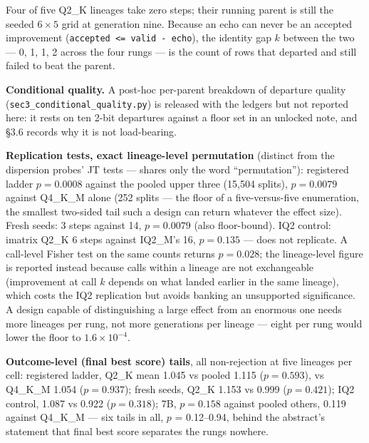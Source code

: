 Four of five Q2\_K lineages take zero steps; their running parent is still the seeded $6 \times 5$ grid at generation nine. Because an echo can never be an accepted improvement (\texttt{accepted <= valid - echo}), the identity gap $k$ between the two --- 0, 1, 1, 2 across the four rungs --- is the count of rows that departed and still failed to beat the parent.

\textbf{Conditional quality.} A post-hoc per-parent breakdown of departure quality (\texttt{sec3\_conditional\_quality.py}) is released with the ledgers but not reported here: it rests on ten 2-bit departures against a floor set in an unlocked note, and \S3.6 records why it is not load-bearing.

\textbf{Replication tests, exact lineage-level permutation} (distinct from the dispersion probes' JT tests --- shares only the word ``permutation''): registered ladder $p = 0.0008$ against the pooled upper three (15,504 splits), $p = 0.0079$ against Q4\_K\_M alone (252 splits --- the floor of a five-versus-five enumeration, the smallest two-sided tail such a design can return whatever the effect size). Fresh seeds: 3 steps against 14, $p = 0.0079$ (also floor-bound). IQ2 control: imatrix Q2\_K 6 steps against IQ2\_M's 16, $p = 0.135$ --- does not replicate. A call-level Fisher test on the same counts returns $p = 0.028$; the lineage-level figure is reported instead because calls within a lineage are not exchangeable (improvement at call $k$ depends on what landed earlier in the same lineage), which costs the IQ2 replication but avoids banking an unsupported significance. A design capable of distinguishing a large effect from an enormous one needs more lineages per rung, not more generations per lineage --- eight per rung would lower the floor to $1.6\times10^{-4}$.

\textbf{Outcome-level (final best score) tails}, all non-rejection at five lineages per cell: registered ladder, Q2\_K mean 1.045 vs pooled 1.115 ($p = 0.593$), vs Q4\_K\_M 1.054 ($p = 0.937$); fresh seeds, Q2\_K 1.153 vs 0.999 ($p = 0.421$); IQ2 control, 1.087 vs 0.922 ($p = 0.318$); 7B, $p = 0.158$ against pooled others, 0.119 against Q4\_K\_M --- six tails in all, $p$ = 0.12--0.94, behind the abstract's statement that final best score separates the rungs nowhere.

